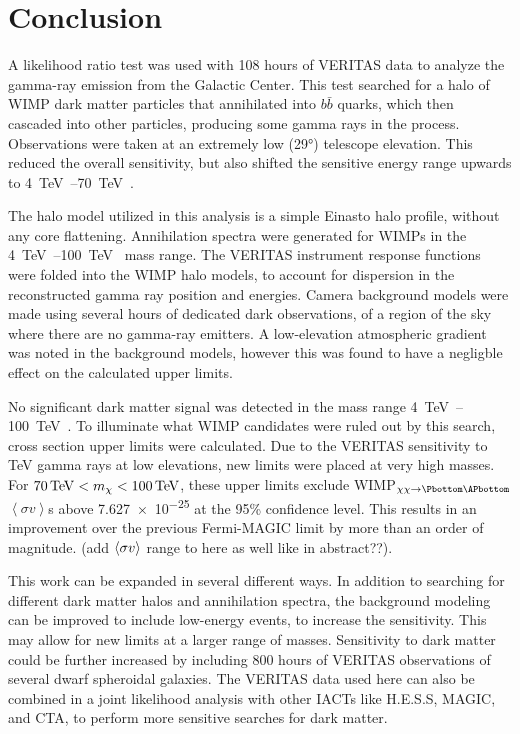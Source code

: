 \cleartooddpage[\thispagestyle{empty}]
\chapter{Conclusion}

A likelihood ratio test was used with 108 hours of VERITAS data to analyze the gamma-ray emission from the Galactic Center.
This test searched for a halo of WIMP dark matter particles that annihilated into $b\bar{b}$ quarks, which then cascaded into other particles, producing some gamma rays in the process.
Observations were taken at an extremely low (\nicetilde{}\ang{29}) telescope elevation.
This reduced the overall sensitivity, but also shifted the sensitive energy range upwards to \SIrange{4}{70}{\TeV{}}.

The halo model utilized in this analysis is a simple Einasto halo profile, without any core flattening.
Annihilation spectra were generated for WIMPs in the \SIrange{4}{100}{\TeV{}} mass range.
The VERITAS instrument response functions were folded into the WIMP halo models, to account for dispersion in the reconstructed gamma ray position and energies.
Camera background models were made using several hours of dedicated dark observations, of a region of the sky where there are no gamma-ray emitters.
A low-elevation atmospheric gradient was noted in the background models, however this was found to have a negligble effect on the calculated upper limits.

No significant dark matter signal was detected in the mass range \SIrange{4}{100}{\TeV{}}.
To illuminate what WIMP candidates were ruled out by this search, cross section upper limits were calculated.
Due to the VERITAS sensitivity to TeV gamma rays at low elevations, new limits were placed at very high masses.
For $70\,\TeV<m_{\chi}<100\,\TeV$, these upper limits exclude WIMP$_{\chi\chi\rightarrow\Pbottom\APbottom}$ $\left \langle \sigma v \right \rangle$s above \SI{7.627e-25}{} at the 95\% confidence level.
This results in an improvement over the previous Fermi-MAGIC limit by more than an order of magnitude.
{\color{red}(add $\left \langle \sigma v \right \rangle$ range to here as well like in abstract??)}.

This work can be expanded in several different ways.
In addition to searching for different dark matter halos and annihilation spectra, the background modeling can be improved to include low-energy events, to increase the sensitivity.
This may allow for new limits at a larger range of masses.
Sensitivity to dark matter could be further increased by including \nicetilde{}800 hours of VERITAS observations of several dwarf spheroidal galaxies.
The VERITAS data used here can also be combined in a joint likelihood analysis with other IACTs like H.E.S.S, MAGIC, and CTA, to perform more sensitive searches for dark matter.

